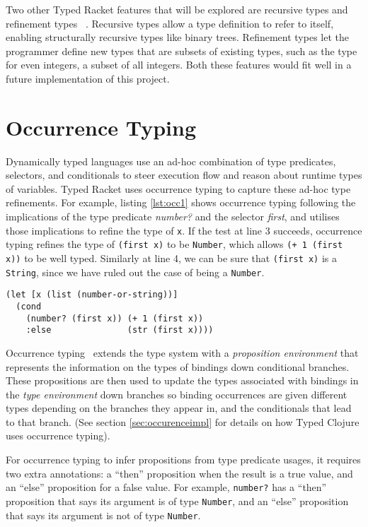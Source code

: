 Two other Typed Racket features that will be explored are recursive types and refinement types  
~\cite{Tob10}. Recursive types allow a type definition to refer to itself, enabling structurally
recursive types like binary trees. Refinement types let the programmer define
new types that are subsets of existing types, such as the type for even integers, a subset of all integers.
Both these features would fit well in a future implementation of this project.

\section{Occurrence Typing}
\label{sec:OccurrenceTyping}

Dynamically typed languages use an ad-hoc combination of type predicates,
selectors, and conditionals to steer execution flow and reason about runtime types of variables.
Typed Racket uses occurrence typing to capture these ad-hoc type refinements.
For example, listing \ref{lst:occ1} shows occurrence typing following the implications 
of the type predicate \emph{number?} and the selector \emph{first}, and utilises those implications to refine
the type of \lstinline|x|. If the test at line 3 succeeds, occurrence typing refines the
type of \lstinline|(first x)| to be \lstinline|Number|, which allows \lstinline|(+ 1 (first x))|
to be well typed. Similarly at line 4, we can be sure that \lstinline|(first x)| is
a \lstinline|String|, since we have ruled out the case of being a \lstinline|Number|.

\begin{lstlisting}[caption=A well typed form utilising occurrence typing with Clojure syntax, label=lst:occ1]
(let [x (list (number-or-string))]
  (cond 
    (number? (first x)) (+ 1 (first x))
    :else               (str (first x))))
\end{lstlisting}

Occurrence typing~\cite{TF08,TF10} extends the type 
system with a \emph{proposition environment} that represents 
the information on the types of bindings down conditional branches.
These propositions are then used to update the types associated
with bindings in the \emph{type environment} down branches
so binding occurrences are given different types 
depending on the branches they appear in, and the conditionals
that lead to that branch.
(See section \ref{sec:occurenceimpl} for details on how Typed Clojure uses occurrence typing).

For occurrence typing to infer propositions from type predicate usages, it requires 
two extra annotations: a ``then'' proposition
when the result is a true value, and an ``else'' proposition for a false value.
For example, \lstinline|number?| has a ``then'' proposition that says its argument
is of type \lstinline|Number|, and an ``else'' proposition that says its argument is not of type \lstinline|Number|.

